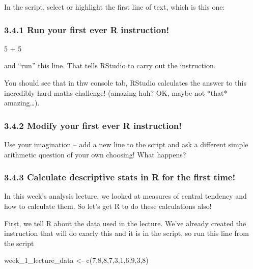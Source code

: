 \documentclass[
]{book}
\newenvironment{Shaded}{\begin{snugshade}}{\end{snugshade}}
\newcommand{\DecValTok}[1]{\textcolor[rgb]{0.00,0.00,0.81}{#1}}
\newcommand{\FunctionTok}[1]{\textcolor[rgb]{0.00,0.00,0.00}{#1}}
\newcommand{\NormalTok}[1]{#1}
\newcommand{\OtherTok}[1]{\textcolor[rgb]{0.56,0.35,0.01}{#1}}
\newcommand{\SpecialCharTok}[1]{\textcolor[rgb]{0.00,0.00,0.00}{#1}}
\begin{document}
In the script, select or highlight the first line of text, which is this one:

\hypertarget{run-your-first-ever-r-instruction}{%
\subsubsection{3.4.1 Run your first ever R instruction!}\label{run-your-first-ever-r-instruction}}

\begin{Shaded}
\begin{Highlighting}[]
\DecValTok{5} \SpecialCharTok{+} \DecValTok{5}
\end{Highlighting}
\end{Shaded}

and ``run'' this line. That tells RStudio to carry out the instruction.

You should see that in thw console tab, RStudio calculates the answer to this incredibly hard maths challenge! (amazing huh? OK, maybe not *that* amazing\ldots).

\hypertarget{modify-your-first-ever-r-instruction}{%
\subsubsection{3.4.2 Modify your first ever R instruction!}\label{modify-your-first-ever-r-instruction}}

Use your imagination -- add a new line to the script and ask a different simple arithmetic question of your own choosing! What happens?

\hypertarget{calculate-descriptive-stats-in-r-for-the-first-time}{%
\subsubsection{3.4.3 Calculate descriptive stats in R for the first time!}\label{calculate-descriptive-stats-in-r-for-the-first-time}}

In this week's analysis lecture, we looked at measures of central tendency and how to calculate them. So let's get R to do these calculations also!

First, we tell R about the data used in the lecture. We've already created the instruction that will do exacly this and it is in the script, so run this line from the script

\begin{Shaded}
\begin{Highlighting}[]
\NormalTok{week\_1\_lecture\_data }\OtherTok{\textless{}{-}} \FunctionTok{c}\NormalTok{(}\DecValTok{7}\NormalTok{,}\DecValTok{8}\NormalTok{,}\DecValTok{8}\NormalTok{,}\DecValTok{7}\NormalTok{,}\DecValTok{3}\NormalTok{,}\DecValTok{1}\NormalTok{,}\DecValTok{6}\NormalTok{,}\DecValTok{9}\NormalTok{,}\DecValTok{3}\NormalTok{,}\DecValTok{8}\NormalTok{)}
\end{Highlighting}
\end{Shaded}
\end{document}
